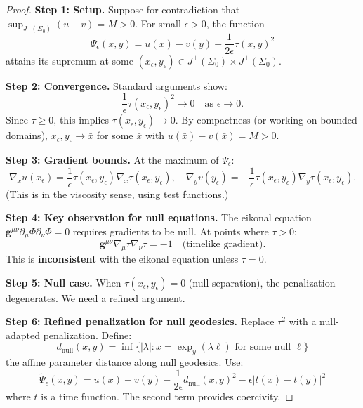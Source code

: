 \begin{proof}
\textbf{Step 1: Setup.} Suppose for contradiction that $\sup_{J^+(\Sigma_0)}(u - v) = M > 0$. For small $\epsilon > 0$, the function
\begin{equation}
    \Psi_\epsilon(x, y) = u(x) - v(y) - \frac{1}{2\epsilon}\tau(x, y)^2
\end{equation}
attains its supremum at some $(x_\epsilon, y_\epsilon) \in J^+(\Sigma_0) \times J^+(\Sigma_0)$.

\textbf{Step 2: Convergence.} Standard arguments show:
\begin{equation}
    \frac{1}{\epsilon}\tau(x_\epsilon, y_\epsilon)^2 \to 0 \quad \text{as } \epsilon \to 0.
\end{equation}
Since $\tau \geq 0$, this implies $\tau(x_\epsilon, y_\epsilon) \to 0$. By compactness (or working on bounded domains), $x_\epsilon, y_\epsilon \to \bar{x}$ for some $\bar{x}$ with $u(\bar{x}) - v(\bar{x}) = M > 0$.

\textbf{Step 3: Gradient bounds.} At the maximum of $\Psi_\epsilon$:
\begin{equation}
    \nabla_x u(x_\epsilon) = \frac{1}{\epsilon}\tau(x_\epsilon, y_\epsilon)\nabla_x\tau(x_\epsilon, y_\epsilon), \quad
    \nabla_y v(y_\epsilon) = -\frac{1}{\epsilon}\tau(x_\epsilon, y_\epsilon)\nabla_y\tau(x_\epsilon, y_\epsilon).
\end{equation}
(This is in the viscosity sense, using test functions.)

\textbf{Step 4: Key observation for null equations.} The eikonal equation $\mathbf{g}^{\mu\nu}\partial_\mu\Phi\partial_\nu\Phi = 0$ requires gradients to be null. At points where $\tau > 0$:
\begin{equation}
    \mathbf{g}^{\mu\nu}\nabla_\mu\tau\nabla_\nu\tau = -1 \quad \text{(timelike gradient)}.
\end{equation}
This is \textbf{inconsistent} with the eikonal equation unless $\tau = 0$.

\textbf{Step 5: Null case.} When $\tau(x_\epsilon, y_\epsilon) = 0$ (null separation), the penalization degenerates. We need a refined argument.

\textbf{Step 6: Refined penalization for null geodesics.} Replace $\tau^2$ with a null-adapted penalization. Define:
\begin{equation}
    d_{\text{null}}(x, y) = \inf\{|\lambda| : x = \exp_y(\lambda \ell) \text{ for some null } \ell\}
\end{equation}
the affine parameter distance along null geodesics. Use:
\begin{equation}
    \tilde{\Psi}_\epsilon(x, y) = u(x) - v(y) - \frac{1}{2\epsilon}d_{\text{null}}(x, y)^2 - \epsilon|t(x) - t(y)|^2
\end{equation}
where $t$ is a time function. The second term provides coercivity.


\end{proof}
